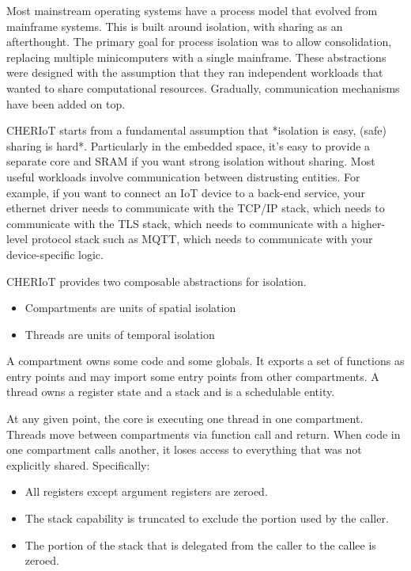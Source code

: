 Most mainstream operating systems have a process model that evolved from mainframe systems.
This is built around isolation, with sharing as an afterthought.
The primary goal for process isolation was to allow consolidation, replacing multiple minicomputers with a single mainframe.
These abstractions were designed with the assumption that they ran independent workloads that wanted to share computational resources.
Gradually, communication mechanisms have been added on top.

CHERIoT starts from a fundamental assumption that *isolation is easy, (safe) sharing is hard*.
Particularly in the embedded space, it's easy to provide a separate core and SRAM if you want strong isolation without sharing.
Most useful workloads involve communication between distrusting entities.
For example, if you want to connect an IoT device to a back-end service, your ethernet driver needs to communicate with the TCP/IP stack, which needs to communicate with the TLS stack, which needs to communicate with a higher-level protocol stack such as MQTT, which needs to communicate with your device-specific logic.

CHERIoT provides two composable abstractions for isolation.

\begin{itemize}
	\item{Compartments are units of spatial isolation}
	\item{Threads are units of temporal isolation}
\end{itemize}

A compartment owns some code and some globals.
It exports a set of functions as entry points and may import some entry points from other compartments.
A thread owns a register state and a stack and is a schedulable entity.

At any given point, the core is executing one thread in one compartment.
Threads move between compartments via function call and return.
When code in one compartment calls another, it loses access to everything that was not explicitly shared.
Specifically:

\begin{itemize}
	\item{All registers except argument registers are zeroed.}
	\item{The stack capability is truncated to exclude the portion used by the caller.}
	\item{The portion of the stack that is delegated from the caller to the callee is zeroed.}
\end{itemize}

